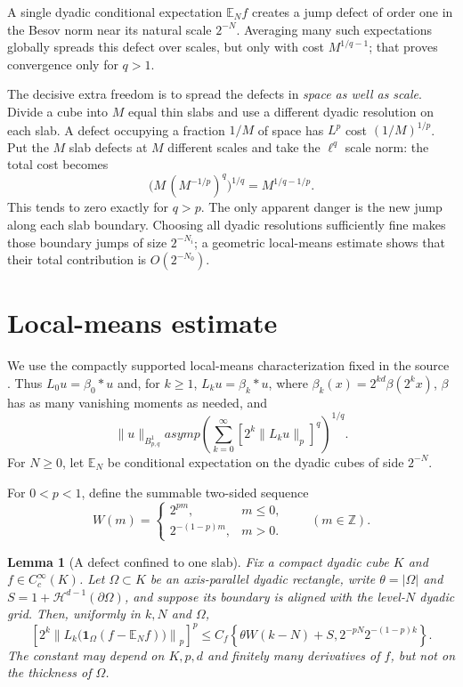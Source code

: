 \documentclass[11pt]{article}
\newtheorem{lemma}{Lemma}
\newcommand{\E}{\mathbb E}
\newcommand{\1}{\mathbf 1}
\begin{document}
A single dyadic conditional expectation $\E_Nf$ creates a jump defect of
order one in the Besov norm near its natural scale $2^{-N}$.  Averaging many
such expectations globally spreads this defect over scales, but only with
cost $M^{1/q-1}$; that proves convergence only for $q>1$.

The decisive extra freedom is to spread the defects in \emph{space as well
as scale}.  Divide a cube into $M$ equal thin slabs and use a different
dyadic resolution on each slab.  A defect occupying a fraction $1/M$ of
space has $L^p$ cost $(1/M)^{1/p}$.  Put the $M$ slab defects at $M$
different scales and take the $\ell^q$ scale norm: the total cost becomes
\[
       \bigl(M\,(M^{-1/p})^q\bigr)^{1/q}
       =M^{1/q-1/p}.
\]
This tends to zero exactly for $q>p$.  The only apparent danger is the new
jump along each slab boundary.  Choosing all dyadic resolutions sufficiently
fine makes those boundary jumps of size $2^{-N_i}$; a geometric local-means
estimate shows that their total contribution is $O(2^{-N_0})$.

\section{Local-means estimate}

We use the compactly supported local-means characterization fixed in the
source \cite[(12)]{GSU}.  Thus $L_0u=\beta_0*u$ and, for $k\ge1$,
$L_ku=\beta_k*u$, where $\beta_k(x)=2^{kd}\beta(2^kx)$, $\beta$ has as many
vanishing moments as needed, and
\begin{equation}\label{eq:localnorm}
 \|u\|_{B^1_{p,q}}asymp
 \left(\sum_{k=0}^\infty [2^k\|L_ku\|_p]^q\right)^{1/q}.
\end{equation}
For $N\ge0$, let $\E_N$ be conditional expectation on the dyadic cubes of
side $2^{-N}$.

For $0<p<1$, define the summable two-sided sequence
\begin{equation}\label{eq:W}
 W(m)=
 \begin{cases}
  2^{pm},&m\le0,\\
  2^{-(1-p)m},&m>0.
 \end{cases}
 \qquad (m\in\mathbb Z).
\end{equation}

\begin{lemma}[A defect confined to one slab]\label{lem:slab}
Fix a compact dyadic cube $K$ and $f\in C_c^\infty(K)$.  Let $\Omega\subset K$
be an axis-parallel dyadic rectangle, write
$\theta=|\Omega|$ and
$S=1+\mathcal H^{d-1}(\partial\Omega)$, and suppose its boundary is aligned
with the level-$N$ dyadic grid.  Then, uniformly in $k,N$ and $\Omega$,
\begin{equation}\label{eq:slabestimate}
 \left[2^k\left\|L_k\bigl(\1_\Omega(f-\E_Nf)\bigr)\right\|_p\right]^p
 \le C_f\left\{
       \theta W(k-N)+S,2^{-pN}2^{-(1-p)k}
       \right\}.
\end{equation}
The constant may depend on $K,p,d$ and finitely many derivatives of $f$,
but not on the thickness of $\Omega$.
\end{lemma}
\end{document}
